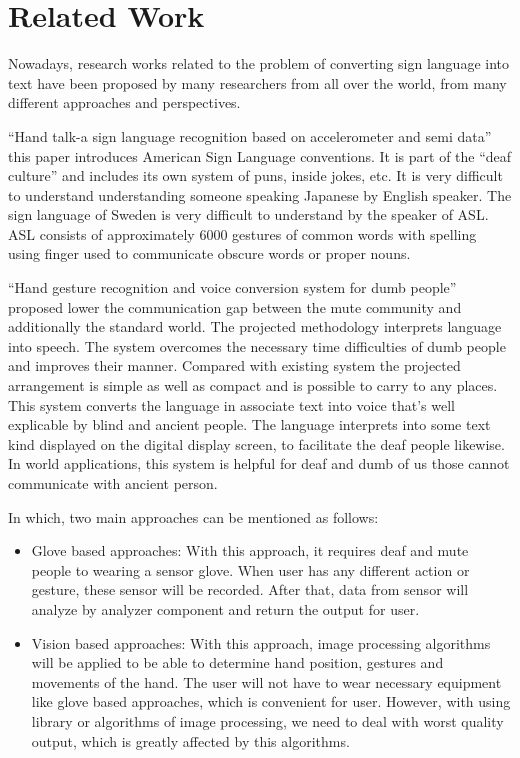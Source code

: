 
\chapter{Related Work}

Nowadays, research works related to the problem of converting sign language into text 
have been proposed by many researchers from all over the world, from many different 
approaches and perspectives.

“Hand talk-a sign language recognition based on
accelerometer and semi data” this paper introduces American
Sign Language conventions. It is part of the “deaf culture” and
includes its own system of puns, inside jokes, etc. It is very
difficult to understand understanding someone speaking
Japanese by English speaker. The sign language of Sweden is
very difficult to understand by the speaker of ASL. ASL
consists of approximately 6000 gestures of common words
with spelling using finger used to communicate obscure words
or proper nouns.

“Hand gesture recognition and voice conversion system for
dumb people” proposed lower the communication gap
between the mute community and additionally the standard
world. The projected methodology interprets language into
speech. The system overcomes the necessary time difficulties
of dumb people and improves their manner. Compared with
existing system the projected arrangement is simple as well as
compact and is possible to carry to any places. This system
converts the language in associate text into voice that's well
explicable by blind and ancient people. The language
interprets into some text kind displayed on the digital display
screen, to facilitate the deaf people likewise. In world
applications, this system is helpful for deaf and dumb of us
those cannot communicate with ancient person.

In which, two main approaches can be mentioned as follows:
\begin{itemize}
  \item Glove based approaches:
  With this approach, it requires deaf and mute people to wearing a sensor glove. When user
  has any different action or gesture, these sensor will be recorded. After that, data from
  sensor will analyze by analyzer component and return the output for user.
  \item Vision based approaches:
  With this approach, image processing algorithms will be applied to be able to determine
  hand position, gestures and movements of the hand. The user will not have to wear necessary
  equipment like glove based approaches, which is convenient for user. However, with using
  library or algorithms of image processing, we need to deal with worst quality output, which is
  greatly affected by this algorithms.
\end{itemize}

